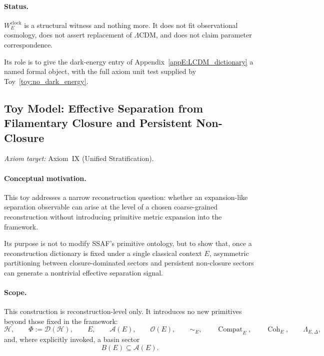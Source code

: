 \documentclass[aps,prx,onecolumn,11pt]{revtex4-2}
\theoremstyle{plain}
\theoremstyle{definition}
\theoremstyle{remark}
\newcommand{\Compat}{\operatorname{Compat}} %
\newcommand{\Coh}{\operatorname{Coh}}       %
\begin{document}
\paragraph{Status.}

\(W^{\mathrm{clock}}_E\) is a structural witness and nothing more. It
does not fit observational cosmology, does not assert replacement of
\(\Lambda\)CDM, and does not claim parameter correspondence.

Its role is to give the dark-energy entry of
Appendix~\ref{appE:LCDM_dictionary} a named formal object, with the full
axiom unit test supplied by Toy~\ref{toy:no_dark_energy}.

\subsection{Toy Model: Effective Separation from Filamentary Closure and Persistent Non-Closure}
\label{toy:ignition_filamentary}

\noindent\emph{Axiom target:} Axiom~IX (Unified Stratification).

\paragraph{Conceptual motivation.}

This toy addresses a narrow reconstruction question: whether an
expansion-like separation observable can arise at the level of a chosen
coarse-grained reconstruction without introducing primitive metric
expansion into the framework.

Its purpose is not to modify SSAF's primitive ontology, but to show
that, once a reconstruction dictionary is fixed under a single
classical context \(E\), asymmetric partitioning between
closure-dominated sectors and persistent non-closure sectors can
generate a nontrivial effective separation signal.

\paragraph{Scope.}

This construction is reconstruction-level only. It introduces no new
primitives beyond those fixed in the framework:
\[
\mathcal H,
\qquad
\Phi:=\mathcal D(\mathcal H),
\qquad
E,
\qquad
\mathcal A(E),
\qquad
\mathcal O(E),
\qquad
\sim_E,
\qquad
\Compat_E,
\qquad
\Coh_E,
\qquad
\Lambda_{E,\Delta},
\]
and, where explicitly invoked, a basin sector
\[
B(E)\subseteq\mathcal A(E).
\]
\end{document}

